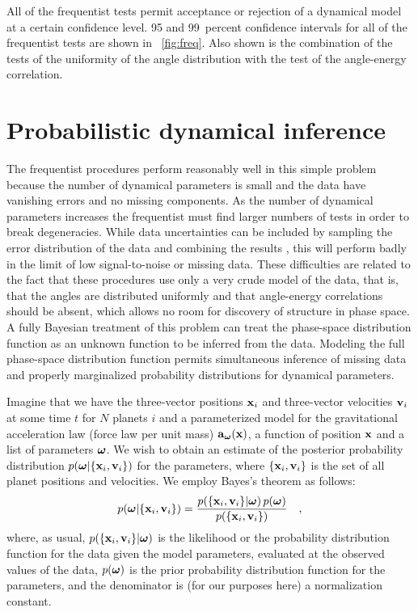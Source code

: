 All of the frequentist tests permit acceptance or rejection of a
dynamical model at a certain confidence level. 95 and 99~percent
confidence intervals for all of the frequentist tests are shown in
\figurename~\ref{fig:freq}. Also shown is the combination of the tests
of the uniformity of the angle distribution with the test of the
angle-energy correlation.

\section{Probabilistic dynamical inference}

The frequentist procedures perform reasonably well in this simple
problem because the number of dynamical parameters is small and the
data have vanishing errors and no missing components. As the number of
dynamical parameters increases the frequentist must find larger
numbers of tests in order to break degeneracies.  While data
uncertainties can be included by sampling the error distribution of
the data and combining the results \citep[\eg, ][]{roulette}, this
will perform badly in the limit of low signal-to-noise or missing
data. These difficulties are related to the fact that these procedures
use only a very crude model of the data, that is, that the angles are
distributed uniformly and that angle-energy correlations should be
absent, which allows no room for discovery of structure in phase
space. A fully Bayesian treatment of this problem can treat the
phase-space distribution function as an unknown function to be
inferred from the data. Modeling the full phase-space distribution
function permits simultaneous inference of missing data and properly
marginalized probability distributions for dynamical parameters.

Imagine that we have the three-vector positions $\boldsymbol{\mathbf{x}}_i$ and
three-vector velocities $\boldsymbol{\mathbf{v}}_i$ at some time $t$ for $N$ planets $i$
and a parameterized model for the gravitational acceleration law
(force law per unit mass) $\boldsymbol{\mathbf{a}}_{\boldsymbol{{\omega}}}(\boldsymbol{\mathbf{x}})$, a function of
position $\boldsymbol{\mathbf{x}}$ and a list of parameters $\boldsymbol{{\omega}}$.  We wish to
obtain an estimate of the posterior probability distribution
$p(\boldsymbol{{\omega}}|\{\boldsymbol{\mathbf{x}}_i,\boldsymbol{\mathbf{v}}_i\})$ for the parameters, where $\{\boldsymbol{\mathbf{x}}_i,\boldsymbol{\mathbf{v}}_i\}$ is the set
of all planet positions and velocities.  We employ Bayes's theorem as
follows:
\begin{equation}\label{eq:bayes}
p(\boldsymbol{{\omega}}|\{\boldsymbol{\mathbf{x}}_i,\boldsymbol{\mathbf{v}}_i\}) = \frac{p(\{\boldsymbol{\mathbf{x}}_i,\boldsymbol{\mathbf{v}}_i\}|\boldsymbol{{\omega}})\,p(\boldsymbol{{\omega}})}{p(\{\boldsymbol{\mathbf{x}}_i,\boldsymbol{\mathbf{v}}_i\})} \quad,
\end{equation}
where, as usual, $p(\{\boldsymbol{\mathbf{x}}_i,\boldsymbol{\mathbf{v}}_i\}|\boldsymbol{{\omega}})$ is the likelihood or the
probability distribution function for the data given the model
parameters, evaluated at the observed values of the data,
$p(\boldsymbol{{\omega}})$ is the prior probability distribution function for the
parameters, and the denominator is (for our purposes here) a
normalization constant.

